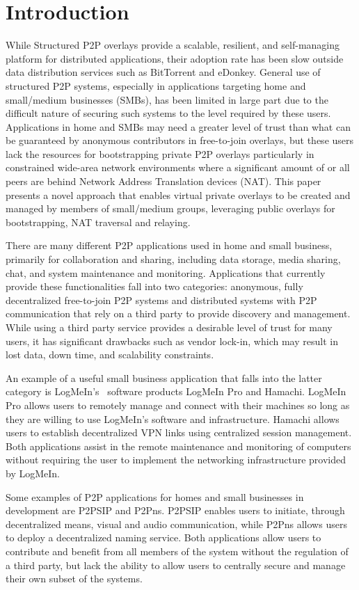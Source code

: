 \documentclass[conference]{IEEEtran}
\begin{document}
\section{Introduction}
While Structured P2P overlays provide a scalable, resilient, and self-managing
platform for distributed applications, their adoption rate has been slow outside
data distribution services such as BitTorrent
and eDonkey.  General use of structured P2P systems, especially in applications
targeting home and small/medium businesses (SMBs), has been limited in large
part due to the difficult nature of securing such systems to the level required
by these users.  Applications in home
and SMBs may need a greater level of trust than what can be guaranteed by
anonymous contributors in free-to-join overlays, but these users lack the
resources for bootstrapping private P2P overlays particularly in constrained
wide-area network environments where a significant amount of or all
peers are behind Network Address Translation devices (NAT). This paper presents
a novel approach that enables virtual private overlays 
to be created and managed by members of small/medium groups, leveraging public
overlays for bootstrapping, NAT traversal and relaying.

There are many different P2P applications used in home and small business,
primarily for collaboration and sharing, including data storage, media
sharing, chat, and system maintenance and monitoring.
Applications that currently provide these functionalities fall into two
categories:  anonymous, fully decentralized free-to-join P2P systems and
distributed systems with P2P communication that rely on a third party to provide
discovery and management.  While using a third party service provides a desirable
level of trust for many users, it has significant drawbacks such as vendor lock-in,
which may result in lost data, down time, and scalability constraints.

An example of a useful small business application that falls into the latter
category is LogMeIn's~\cite{logmein} software products LogMeIn Pro and Hamachi.
LogMeIn Pro allows users to remotely manage and connect with their machines so
long as they are willing to use LogMeIn's software and infrastructure.  Hamachi
allows users to establish decentralized VPN links using centralized session
management.  Both applications assist in the remote maintenance and monitoring
of computers without requiring the user to implement the networking
infrastructure provided by LogMeIn.

Some examples of P2P applications for homes and small
businesses in development are P2PSIP and P2Pns.  P2PSIP enables users to initiate, through decentralized means, visual
and audio communication, while P2Pns allows users to deploy a decentralized
naming service.  Both applications allow users to contribute and benefit from
all members of the system without the regulation of a third party, but lack the
ability to allow users to centrally secure and manage their own subset of the
systems.
\end{document}
